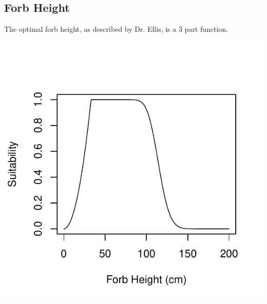 \documentclass[12pt,letterpaper]{article}\usepackage{graphicx, color}
\makeatletter
\def\maxwidth{ %
  \ifdim\Gin@nat@width>\linewidth
    \linewidth
  \else
    \Gin@nat@width
  \fi
}
\newenvironment{knitrout}{}{} %
\makeatother
\begin{document}
\subsection{Forb Height}
The optimal forb height, as described by Dr. Ellis, is a 3 part function.

\begin{knitrout}
\color{fgcolor}\includegraphics[width=\maxwidth]{figure/Ellis_Forb_Height} 
\end{knitrout}
\end{document}
